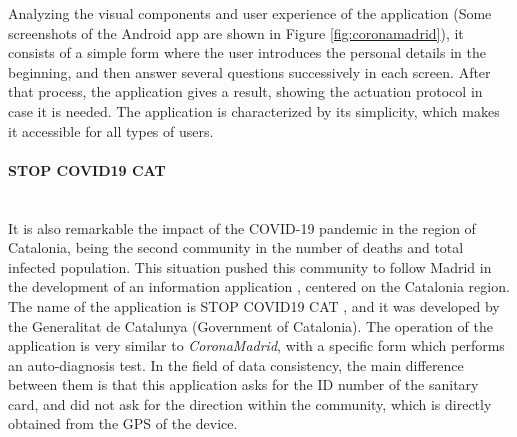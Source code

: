 \documentclass[a4paper, 12pt]{article}
\begin{document}
Analyzing the visual components and user experience of the application (Some screenshots of the Android app are shown in Figure \ref{fig:coronamadrid}), it consists of a simple form where the user introduces the personal details in the beginning, and then answer several questions successively in each screen. After that process, the application gives a result, showing the actuation protocol in case it is needed. The application is characterized by its simplicity, which makes it accessible for all types of users.

\paragraph{STOP COVID19 CAT} \mbox{} \\

It is also remarkable the impact of the COVID-19 pandemic in the region of Catalonia, being the second community in the number of deaths and total infected population. This situation pushed this community to follow Madrid in the development of an information application \cite{first-covid19-apps}, centered on the Catalonia region. The name of the application is STOP COVID19 CAT \cite{stop-covid19-cat}, and it was developed by the Generalitat de Catalunya (Government of Catalonia). The operation of the application is very similar to \textit{CoronaMadrid}, with a specific form which performs an auto-diagnosis test. In the field of data consistency, the main difference between them is that this application asks for the ID number of the sanitary card, and did not ask for the direction within the community, which is directly obtained from the GPS of the device. \\
\end{document}

